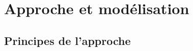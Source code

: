\chapter{Approche et modélisation}\label{chap:mod}
\minitoc
\section{Principes de l'approche}\label{sec:principes}



